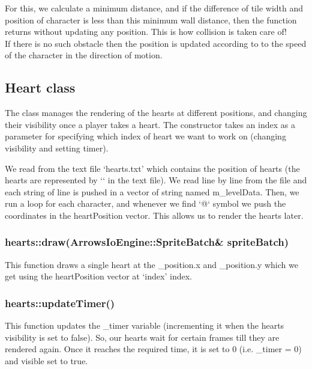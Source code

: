 \documentclass{article}
\begin{document}
For this, we calculate a minimum distance, and if the difference of tile width and position of character is less than this minimum wall distance, then the function returns without updating any position. This is how collision is taken care of! \\

If there is no such obstacle then the position is updated according to to the speed of the character in the direction of motion. \\


\subsection{Heart class}
The class manages the rendering of the hearts at different positions, and changing their visibility once a player takes a heart. The constructor takes an index as a parameter for specifying which index of heart we want to work on (changing visibility and setting timer). \newline

We read from the text file ‘hearts.txt’ which contains the position of hearts (the hearts are represented by ‘\@‘ in the text file). We read line by line from the file and each string of line is pushed in a vector of string named m\_levelData. Then, we run a loop for each character, and whenever we find ‘@‘ symbol we push the coordinates in the heartPosition vector. This allows us to render the hearts later.
\newline

\subsubsection{hearts::draw(ArrowsIoEngine::SpriteBatch& spriteBatch) }
This function draws a single heart at the \_position.x and \_position.y which we get using the heartPosition vector at ‘index’ index.
\newline

\subsubsection{hearts::updateTimer() }
This function updates the \_timer variable (incrementing it when the hearts visibility is set to false). So, our hearts wait for certain frames till they are rendered again. Once it reaches the required time, it is set to 0 (i.e. \_timer = 0) and visible set to true.
\newline
\end{document}
